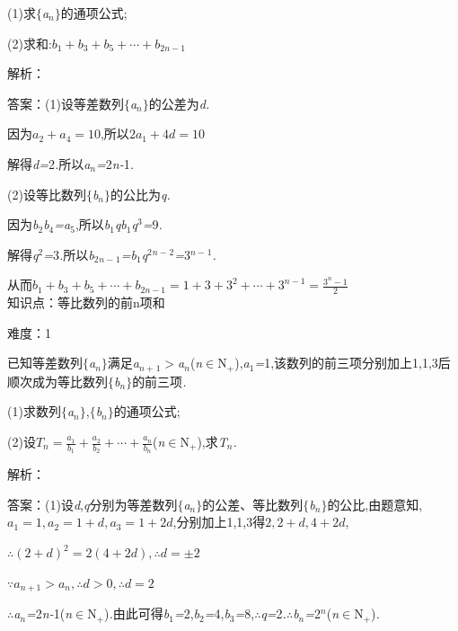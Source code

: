 \documentclass{article} %
\begin{document}
 (1)求$\mathrm{\{}$\textit{a${}_{n}$}$\mathrm{\}}$的通项公式;

 (2)求和:$b_1+b_3+b_5+\cdots+b_{2n-1}$

解析：

 答案：(1)设等差数列$\mathrm{\{}$\textit{a${}_{n}$}$\mathrm{\}}$的公差为\textit{d.}

因为$a_2+a_4=10$,所以$2a_1+4d=10$

解得\textit{d=}2\textit{.}所以\textit{a${}_{n}$=}2\textit{n-}1\textit{.}

(2)设等比数列$\mathrm{\{}$\textit{b${}_{n}$}$\mathrm{\}}$的公比为\textit{q.}

因为\textit{b}${}_{2}$\textit{b}${}_{4}$\textit{=a}${}_{5}$,所以\textit{b}${}_{1}$\textit{qb}${}_{1}$\textit{q}${}^{3}$\textit{=}9\textit{.}

解得\textit{q}${}^{2}$\textit{=}3\textit{.}所以\textit{b}${}_{2}$\textit{${}_{n-}$}${}_{1}$\textit{=b}${}_{1}$\textit{q}${}^{2}$\textit{${}^{n-}$}${}^{2}$\textit{=}3\textit{${}^{n-}$}${}^{1}$\textit{.}

从而$b_1+b_3+b_5+\cdots+b_{2n-1}=1+3+3^2+\cdots+3^{n-1}=\frac{3^n-1}{2}$ \\

知识点：等比数列的前n项和

难度：1

 已知等差数列$\mathrm{\{}$\textit{a${}_{n}$}$\mathrm{\}}$满足\textit{a${}_{n+}$}${}_{1}$\textit{$>$a${}_{n}$}(\textit{n}$\mathrm{\in}$N\textit{${}_{+}$}),\textit{a}${}_{1}$\textit{=}1,该数列的前三项分别加上1,1,3后顺次成为等比数列$\mathrm{\{}$\textit{b${}_{n}$}$\mathrm{\}}$的前三项\textit{.}

 (1)求数列$\mathrm{\{}$\textit{a${}_{n}$}$\mathrm{\}}$,$\mathrm{\{}$\textit{b${}_{n}$}$\mathrm{\}}$的通项公式;

 (2)设$T_n=\frac{a_1}{b_1}+\frac{a_2}{b_2}+\cdots+\frac{a_n}{b_n}$(\textit{n}$\mathrm{\in}$N\textit{${}_{+}$}),求\textit{T${}_{n}$.}

解析：

 答案：(1)设\textit{d},\textit{q}分别为等差数列$\mathrm{\{}$\textit{a${}_{n}$}$\mathrm{\}}$的公差、等比数列$\mathrm{\{}$\textit{b${}_{n}$}$\mathrm{\}}$的公比,由题意知,$a_1=1,a_2=1+d,a_3=1+2d$,分别加上1,1,3得$2,2+d,4+2d$,

$\therefore (2+d)^2=2(4+2d), \therefore d=\pm 2$

$\because a_{n+1}>a_n, \therefore d>0, \therefore d=2$

\textit{$\therefore$a${}_{n}$=}2\textit{n-}1(\textit{n}$\mathrm{\in}$N\textit{${}_{+}$})\textit{.}由此可得\textit{b}${}_{1}$\textit{=}2,\textit{b}${}_{2}$\textit{=}4,\textit{b}${}_{3}$\textit{=}8,\textit{$\therefore$q=}2\textit{.$\therefore$b${}_{n}$=}2\textit{${}^{n}$}(\textit{n}$\mathrm{\in}$N\textit{${}_{+}$})\textit{.}
\end{document}
